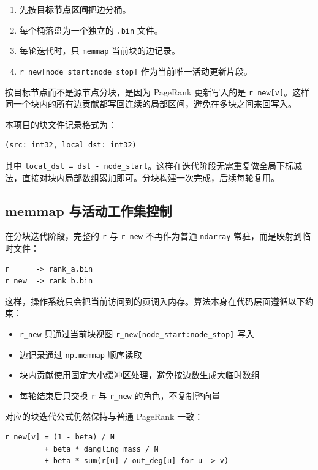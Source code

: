 \documentclass[UTF8,a4paper,12pt]{ctexart}
\begin{document}
\begin{enumerate}
\item 先按\textbf{目标节点区间}把边分桶。
\item 每个桶落盘为一个独立的 \texttt{.bin} 文件。
\item 每轮迭代时，只 \texttt{memmap} 当前块的边记录。
\item \texttt{r\_new[node\_start:node\_stop]} 作为当前唯一活动更新片段。
\end{enumerate}


按目标节点而不是源节点分块，是因为 PageRank 更新写入的是 \texttt{r\_new[v]}。这样同一个块内的所有边贡献都写回连续的局部区间，避免在多块之间来回写入。


本项目的块文件记录格式为：


\begin{lstlisting}
(src: int32, local_dst: int32)
\end{lstlisting}


其中 \texttt{local\_dst = dst - node\_start}。这样在迭代阶段无需重复做全局下标减法，直接对块内局部数组累加即可。分块构建一次完成，后续每轮复用。


\subsection{memmap 与活动工作集控制}


在分块迭代阶段，完整的 \texttt{r} 与 \texttt{r\_new} 不再作为普通 \texttt{ndarray} 常驻，而是映射到临时文件：


\begin{lstlisting}
r      -> rank_a.bin
r_new  -> rank_b.bin
\end{lstlisting}


这样，操作系统只会把当前访问到的页调入内存。算法本身在代码层面遵循以下约束：


\begin{itemize}
\item \texttt{r\_new} 只通过当前块视图 \texttt{r\_new[node\_start:node\_stop]} 写入
\item 边记录通过 \texttt{np.memmap} 顺序读取
\item 块内贡献使用固定大小缓冲区处理，避免按边数生成大临时数组
\item 每轮结束后只交换 \texttt{r} 与 \texttt{r\_new} 的角色，不复制整向量
\end{itemize}


对应的块迭代公式仍然保持与普通 PageRank 一致：


\begin{lstlisting}
r_new[v] = (1 - beta) / N
         + beta * dangling_mass / N
         + beta * sum(r[u] / out_deg[u] for u -> v)
\end{lstlisting}
\end{document}
